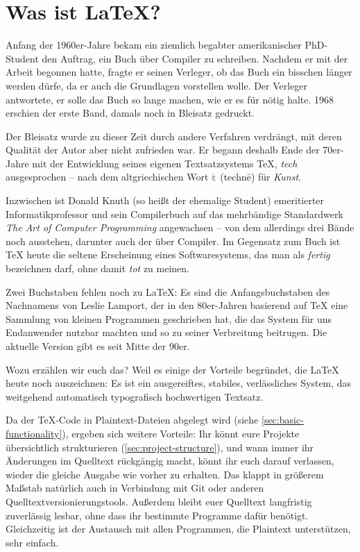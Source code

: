 \section{Was ist \LaTeX?}
\label{sec:what-is-latex}

Anfang der 1960er-Jahre bekam ein ziemlich begabter amerikanischer PhD-Student den Auftrag, ein Buch über Compiler zu schreiben.
Nachdem er mit der Arbeit begonnen hatte, fragte er seinen Verleger, ob das Buch ein bisschen länger werden dürfe, da er auch die Grundlagen vorstellen wolle.
Der Verleger antwortete, er solle das Buch so lange machen, wie er es für nötig halte.
1968 erschien der erste Band, damals noch in Bleisatz gedruckt.

Der Bleisatz wurde zu dieser Zeit durch andere Verfahren verdrängt, mit deren Qualität der Autor aber nicht zufrieden war. 
Er begann deshalb Ende der 70er-Jahre mit der Entwicklung seines eigenen Textsatzsystems \TeX, \emph{tech} ausgesprochen – nach dem altgriechischen Wort \texttau$\mathrm{\acute{\varepsilon}}$\textchi\textnu\texteta{} (technē) für \emph{Kunst}.

Inzwischen ist Donald Knuth (so heißt der ehemalige Student) emeritierter Informatikprofessor und sein Compilerbuch auf das mehrbändige Standardwerk \emph{The Art of Computer Programming} angewachsen – von dem allerdings drei Bände noch ausstehen, darunter auch der über Compiler.
Im Gegensatz zum Buch ist \TeX{} heute die seltene Erscheinung eines Softwaresystems, das man als \emph{fertig} bezeichnen darf, ohne damit \emph{tot} zu meinen.

Zwei Buchstaben fehlen noch zu \LaTeX: 
Es sind die Anfangsbuchstaben des Nachnamens von Leslie Lamport, der in den 80er-Jahren basierend auf \TeX{} eine Sammlung von kleinen Programmen geschrieben hat, die das System für uns Endanwender nutzbar machten und so zu seiner Verbreitung beitrugen.
Die aktuelle Version \LaTeXe{} gibt es seit Mitte der 90er.

Wozu erzählen wir euch das? 
Weil es einige der Vorteile begründet, die \LaTeX{} heute noch auszeichnen:
Es ist ein ausgereiftes, stabiles, verlässliches System,
das weitgehend automatisch typografisch hochwertigen Textsatz.

Da der \TeX-Code in Plaintext-Dateien abgelegt wird (siehe \cref{sec:basic-functionality}), ergeben sich weitere Vorteile:
Ihr könnt eure Projekte übersichtlich strukturieren (\cref{sec:project-structure}),
und wann immer ihr Änderungen im Quelltext rückgängig macht, könnt ihr euch darauf verlassen, wieder die gleiche Ausgabe wie vorher zu erhalten. 
Das klappt in größerem Maßstab natürlich auch in Verbindung mit Git oder anderen Quelltextversionierungstools.
Außerdem bleibt euer Quelltext langfristig zuverlässig lesbar, ohne dass ihr bestimmte Programme dafür benötigt.
Gleichzeitig ist der Austausch mit allen Programmen, die Plaintext unterstützen, sehr einfach.

